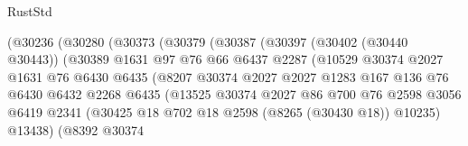 \begin{lexlean}{RustStd}
\begin{coremodule}
{\begin{coremodule}
{{{{{{{{{{{{{{{{{{{{{{{{{{{{{{{{{{{{{{{{{{{{{{{{{{{{{{                          (@30236
                            (@30280
                              (@30373
                                (@30379
                                  (@30387
                                    (@30397
                                      (@30402 (@30440 @30443))
                                      (@30389
                                        @1631
                                        @97
                                        @76
                                        @66
                                        @6437
                                        @2287
                                        (@10529
                                          @30374
                                          @2027
                                          @1631
                                          @76
                                          @6430
                                          @6435
                                          (@8207
                                            @30374
                                            @2027
                                            @2027
                                            @1283
                                            @167
                                            @136
                                            @76
                                            @6430
                                            @6432
                                            @2268
                                            @6435
                                            (@13525
                                              @30374
                                              @2027
                                              @86
                                              @700
                                              @76
                                              @2598
                                              @3056
                                              @6419
                                              @2341
                                              (@30425
                                                @18
                                                @702
                                                @18
                                                @2598
                                                (@8265 (@30430 @18))
                                                @10235)
                                              @13438)
                                            (@8392
                                              @30374
}}}}}}}}}}}}}}}}}}}}}}}}}}}}}}}}}}}}}}}}}}}}}}}}}}}}}}
\end{coremodule}}
\end{coremodule}
\end{lexlean}
